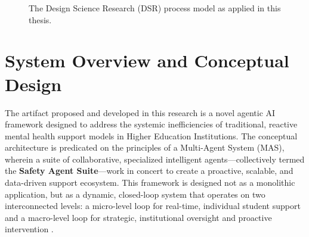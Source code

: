 \begin{figure}[h]
	\centering
	\caption{The Design Science Research (DSR) process model as applied in this thesis.}
	\label{fig:dsr_flowchart}
\end{figure}


\section{System Overview and Conceptual Design}

The artifact proposed and developed in this research is a novel agentic AI framework designed to address the systemic inefficiencies of traditional, reactive mental health support models in Higher Education Institutions. The conceptual architecture is predicated on the principles of a Multi-Agent System (MAS), wherein a suite of collaborative, specialized intelligent agents—collectively termed the \textbf{Safety Agent Suite}—work in concert to create a proactive, scalable, and data-driven support ecosystem. This framework is designed not as a monolithic application, but as a dynamic, closed-loop system that operates on two interconnected levels: a micro-level loop for real-time, individual student support and a macro-level loop for strategic, institutional oversight and proactive intervention \cite{FIND_CITATION_HERE}.


